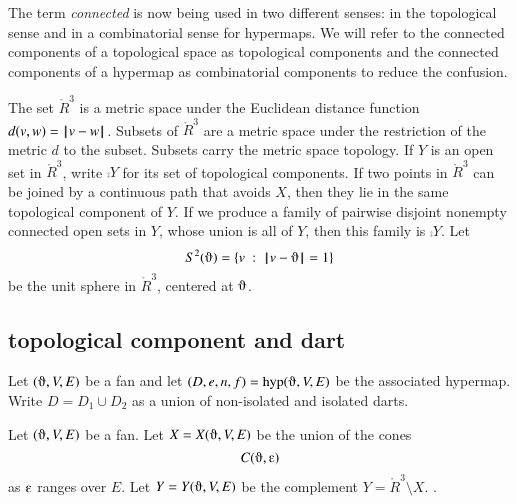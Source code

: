 \begin{remark} The term {\it connected} is now being used in
two different senses: in the topological sense and in a combinatorial
sense for hypermaps.   We will refer to the connected components
of a topological space as topological components and the connected
components of a hypermap as combinatorial components to reduce the confusion.
\end{remark}






The set $\ring{R}^3$ is a metric space under the
Euclidean distance function $d(v,w) = {\hskip0.1em|\hskip-0.15em|\hskip0.1em}v - w{\hskip0.1em|\hskip-0.15em|\hskip0.1em}$.  Subsets of
$\ring{R}^3$ are a metric space under the restriction of the metric
$d$ to the subset. Subsets carry the metric space topology. 
If $Y$ is an open set in $\ring{R}^3$, write
$\comp{Y}$ for its set of topological components.
If two
points in $\ring{R}^3$ 
can be joined by a continuous path that avoids $X$,
then they lie in the same topological component of $Y$.
If we produce a family of pairwise disjoint nonempty connected open sets in
$Y$, whose union is all of $Y$, then
this family is $\comp{Y}$.
Let $$S^2(\orgn) = \{ v \mid \norm{ v}{\orgn } = 1\}$$ be the unit sphere in
$\ring{R}^3$, centered at $\orgn$.  






\subsection{topological component and dart}

Let $(\orgn,V,E)$ be a fan and let $(D,e,n,f) = \op{hyp}(\orgn,V,E)$
be the associated hypermap.  Write $D = D_1\cup D_2$ as a union of
non-isolated and isolated darts.

\begin{definition}[X,~Y]\label{def:XY}
Let $(\orgn,V,E)$ be a fan.  Let $X=X(\orgn,V,E)$ be the union of the
cones
   $$C(\orgn,\e)$$
as $\e$ ranges over $E$.  Let $Y=Y(\orgn,V,E)$ be the complement
$Y = \ring{R}^3\setminus X$.
.
\end{definition}


